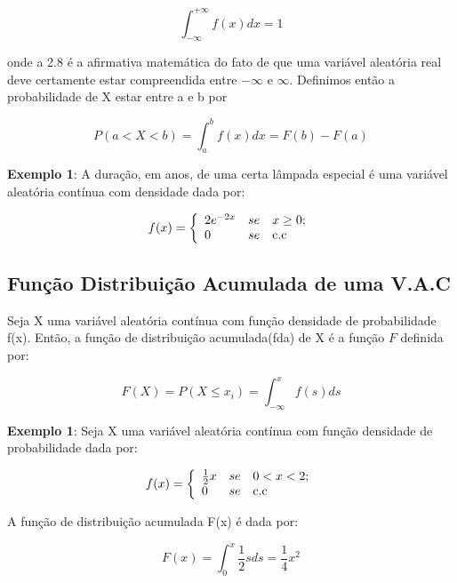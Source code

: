 \begin{equation}\label{}
    \int^{+\infty}_{-\infty}f(x)dx=1
\end{equation}

onde a 2.8 é a afirmativa matemática do fato de que uma variável
aleatória real deve certamente estar compreendida entre $-\infty$
e $\infty$. Definimos então a probabilidade de X estar entre a e b
por

\begin{equation}\label{}
    P(a< X < b)=\int_{a}^{b}f(x)dx = F(b)-F(a)
\end{equation}


\newpage
\textbf{Exemplo 1}: A duração, em anos, de uma certa lâmpada
especial é uma variável aleatória contínua com densidade dada por:


$$
f(x)=
\left\{%
\begin{array}{ll}
   2e^{-2x}       & se \quad \hbox{$x \geq 0$;} \\
   0              & se \quad \hbox{c.c} \\
\end{array}%
\right.
$$



\subsection{Função Distribuição Acumulada de uma V.A.C}

Seja X uma variável aleatória contínua com função densidade de
probabilidade f(x). Então, a função de distribuição acumulada(fda)
de X é a função $F$ definida por:


\begin{equation}\label{F}
    F(X) = P(X\leq x_{i})= \int_{-\infty}^{x}f(s)ds
\end{equation}


\textbf{Exemplo 1}: Seja X uma variável aleatória contínua com
função densidade de probabilidade dada por:

$$
f(x)=
\left\{%
\begin{array}{ll}
   \frac{1}{2}x   & se \quad \hbox{$0 < x < 2$;} \\
   0              & se \quad \hbox{c.c} \\
\end{array}%
\right.
$$

A função de distribuição acumulada F(x) é dada por:

$$
F(x) = \int^{x}_{0}\frac{1}{2}sds = \frac{1}{4}x^{2}
$$

